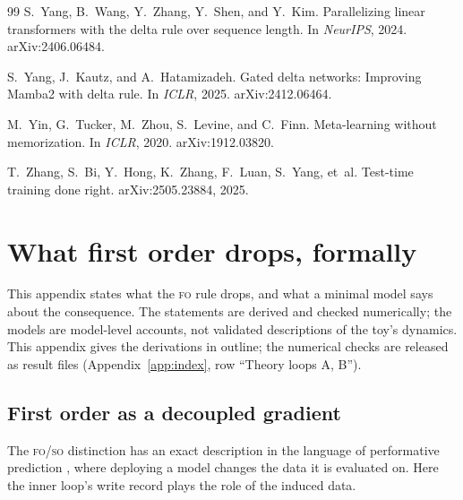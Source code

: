 \documentclass[11pt]{article}
\newcommand{\FO}{\textsc{fo}}
\newcommand{\SO}{\textsc{so}}
\begin{document}
\begin{thebibliography}{99}
S.~Yang, B.~Wang, Y.~Zhang, Y.~Shen, and Y.~Kim.
\newblock Parallelizing linear transformers with the delta rule over sequence length.
\newblock In \emph{NeurIPS}, 2024. arXiv:2406.06484.

S.~Yang, J.~Kautz, and A.~Hatamizadeh.
\newblock Gated delta networks: Improving {Mamba2} with delta rule.
\newblock In \emph{ICLR}, 2025. arXiv:2412.06464.

M.~Yin, G.~Tucker, M.~Zhou, S.~Levine, and C.~Finn.
\newblock Meta-learning without memorization.
\newblock In \emph{ICLR}, 2020. arXiv:1912.03820.

T.~Zhang, S.~Bi, Y.~Hong, K.~Zhang, F.~Luan, S.~Yang, et~al.
\newblock Test-time training done right.
\newblock arXiv:2505.23884, 2025.

\end{thebibliography}

\FloatBarrier
\clearpage
\appendix

\section{What first order drops, formally}
\label{app:theory}

This appendix states what the \FO{} rule drops, and what a minimal model says about the consequence.
The statements are derived and checked numerically; the models are model-level accounts, not
validated descriptions of the toy's dynamics. This appendix gives the derivations in outline; the
numerical checks are released as result files (Appendix~\ref{app:index}, row ``Theory loops A, B'').

\subsection{First order as a decoupled gradient}

The \FO/\SO{} distinction has an exact description in the language of performative prediction
\citep{perdomo2020performative}, where deploying a model changes the data it is evaluated on. Here
the inner loop's write record plays the role of the induced data.
\end{document}
